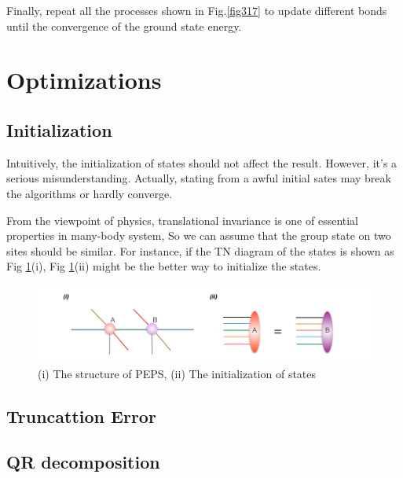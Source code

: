 	Finally, repeat all the processes shown in Fig.\ref{fig317} to update different bonds until the convergence of the ground state energy.

\section{Optimizations}
\label{2dopt}

\subsection{Initialization}
\label{2doptInit}
Intuitively, the initialization of states should not affect the result. However, it's a serious misunderstanding. Actually, stating from a awful initial sates may break the algorithms or hardly converge.

From the viewpoint of physics, translational invariance is one of essential properties in many-body system, So we can assume that the group state on two sites should be similar. For instance, if the TN diagram of the states is shown as Fig \ref{fig321}(i), Fig \ref{fig321}(ii) might be the better way to initialize the states.

\begin{figure}[ht]
	\centering
	\includegraphics[width=1.00\textwidth]{figures/fig321.png}
	\caption[The diagrams of initializing projected entangled pair states]{(i) The structure of PEPS, (ii) The initialization of states}
	\label{fig321}
\end{figure}

\subsection{Truncattion Error}

\subsection{QR decomposition}

